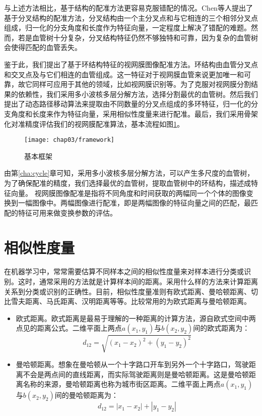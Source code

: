 与上述方法相比，基于结构的配准方法更容易克服错配的情况。Chen\cite{chen2011retinal,chen2015retinal}等人提出了基于分叉结构的配准方法，分叉结构由一个主分叉点和与它相连的三个相邻分叉点组成，归一化的分支角度和长度作为特征向量，一定程度上解决了错配的难题。然而，若是血管树十分复杂，分叉结构特征仍然不够独特和可靠，因为复杂的血管树会使得匹配的血管丢失。

鉴于此，我们提出了基于环结构特征的视网膜图像配准方法。环结构由血管分叉点和交叉点及与它们相连的血管组成。这一特征对于视网膜血管来说更加唯一和可靠，故它同样可应用于其他的领域，比如视网膜识别等。为了克服对视网膜分割结果的依赖性，我们采用多小波核多层分解方法，选择分割最优的血管树。然后我们提出了动态路径移动算法来提取由不同数量的分叉点组成的多环特征，归一化的分支角度和长度来作为特征向量，采用相似性度量来进行配准。最后，我们采用骨架化对准精度评估我们的视网膜配准算法，基本流程如图\ref{fig:framework}。
\begin{figure}
  \centering
  \texttt{[image: chap03/framework]}
  \caption{基本框架}
  \label{fig:framework}
\end{figure}


由第\ref{cha:cycle}章可知，采用多小波核多层分解方法，可以产生多尺度的血管树，为了确保配准的精度，我们选择最优的血管树，提取血管树中的环结构，描述成特征向量。
视网膜图像配准是指将不同角度和时间获取的两幅同一个个体的图像变换到一幅图像中。两幅图像进行配准，即是两幅图像的特征向量之间的匹配，最匹配的特征可用来做变换参数的评估。


\section{相似性度量}
\label{cha:similarity}

在机器学习中，常常需要估算不同样本之间的相似性度量来对样本进行分类或识别。这时，通常采用的方法就是计算样本间的距离。采用什么样的方法来计算距离关系到分类或识别的正确性。目前，相似性度量准则有欧式距离、曼哈顿距离、切比雪夫距离、马氏距离、汉明距离等等。比较常用的为欧式距离与曼哈顿距离。

\begin{itemize}
\item 欧式距离。欧式距离是最易于理解的一种距离的计算方法，源自欧式空间中两点见的距离公式。二维平面上两点$a(x_1,y_1)$与$b(x_2,y_2)$间的欧式距离为：
\begin{equation}
d_{12}=\sqrt{(x_1-x_2)^2+(y_1-y_2)^2}
\end{equation}
\item 曼哈顿距离。想象在曼哈顿从一个十字路口开车到另外一个十字路口，驾驶距离不会是两点间的直线距离，而实际驾驶距离则是曼哈顿距离。这是曼哈顿距离名称的来源，曼哈顿距离也称为城市街区距离。二维平面上两点$a(x_1,y_1)$与$b(x_2,y_2)$间的曼哈顿距离为：
\begin{equation}
d_{12}=|x_1-x_2|+|y_1-y_2|
\end{equation}
\end{itemize}

